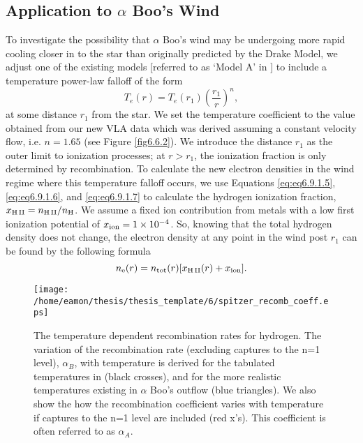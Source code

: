 \subsection{Application to $\alpha$ Boo's Wind}\label{sec:6.6.2}
To investigate the possibility that $\alpha$ Boo's wind may be undergoing more rapid cooling closer in to the star than originally predicted by the Drake Model, we adjust one of the existing models [referred to as `Model A' in \cite{drake_1985}] to include a temperature power-law falloff of the form
\begin{equation}
T_{e}(r)= T_{e}(r_{1})\left(\frac{r_{1}}{r}\right)^{n},
\label{eq:eq2}
\end{equation}
at some distance $r_{1}$ from the star. We set the temperature coefficient to the value obtained from our new VLA data which was derived assuming a constant velocity flow, i.e. $n=1.65$ (see Figure \ref{fig6.6.2}). We introduce the distance $r_{1}$ as the outer limit to ionization processes; at $r > r_{1}$, the ionization fraction is only determined by recombination. To calculate the new electron densities in the wind regime where this temperature falloff occurs, we use Equations \ref{eq:eq6.9.1.5}, \ref{eq:eq6.9.1.6}, and \ref{eq:eq6.9.1.7} to calculate the hydrogen ionization fraction, $x_{\rm{H \, II}}=n_{\rm{H \, II}}/n_{\rm{H}}$. We assume a fixed ion contribution from metals with a low first ionization potential of $x_{\rm{ion}} = 1 \times 10^{-4}$. So, knowing that the total hydrogen density does not change, the electron density at any point in the wind post $r_1$ can be found by the following formula
\begin{equation}
n_{\rm{e}}(r)=n_{\rm{tot}}(r)[x_{\rm{H \, II}}(r) + x_{\rm{ion}}].
\end{equation}

\begin{figure}[hb!]
\centering 
          \texttt{[image: /home/eamon/thesis/thesis\_template/6/spitzer\_recomb\_coeff.eps]}
\caption[The temperature dependent recombination rates for hydrogen]{The temperature dependent recombination rates for hydrogen. The variation of the recombination rate (excluding captures to the n=1 level), $\alpha _{B}$, with temperature is derived for the tabulated temperatures in \cite{spitzer_1978} (black crosses), and for the more realistic temperatures existing in $\alpha$ Boo's outflow (blue triangles). We also show the how the recombination coefficient varies with temperature if captures to the n=1 level are included (red x's). This coefficient is often referred to as $\alpha _{A}$.}
\label{fig6.9.2}
\end{figure}

